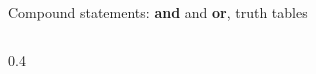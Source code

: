 \documentclass[11pt,aspectratio=1610]{beamer}
\begin{document}
\begin{frame}{Compound statements: \textbf{and} and \textbf{or}, truth tables}
\begin{columns}[t]
\begin{column}{0.4\textwidth}
\vspace{2mm}			
\p							
{}
			\end{column}
			\end{columns}
			
			
			

			
				

		
		
		
	\end{frame}


		
\end{document}
